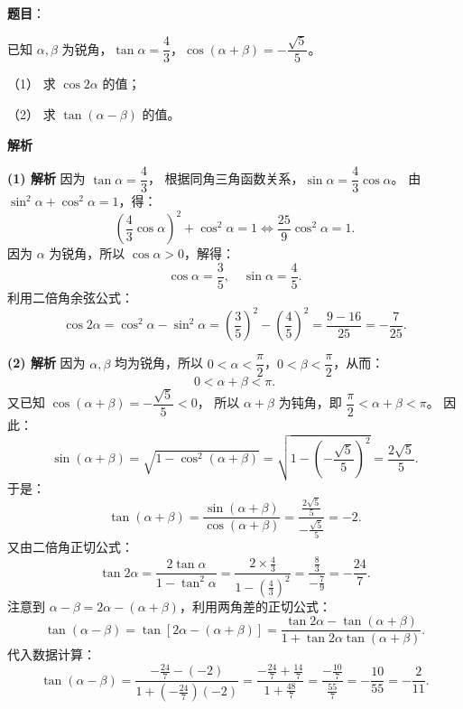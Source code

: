 \begin{answer}

\textbf{题目}：

已知 $\alpha, \beta$ 为锐角，$\tan\alpha = \dfrac{4}{3}$，$\cos(\alpha + \beta) = -\dfrac{\sqrt{5}}{5}$。

（1） 求 $\cos 2\alpha$ 的值；

（2） 求 $\tan(\alpha - \beta)$ 的值。

\textbf{解析}

\textbf{(1) 解析}
因为 $\tan\alpha = \dfrac{4}{3}$，
根据同角三角函数关系，$\sin\alpha = \dfrac{4}{3}\cos\alpha$。
由 $\sin^2\alpha + \cos^2\alpha = 1$，得：
\nopagebreak[4]
\[\left(\frac{4}{3}\cos\alpha\right)^2 + \cos^2\alpha = 1 \iff \frac{25}{9}\cos^2\alpha = 1.\]
因为 $\alpha$ 为锐角，所以 $\cos\alpha > 0$，解得：
\nopagebreak[4]
\[\cos\alpha = \frac{3}{5}, \quad \sin\alpha = \frac{4}{5}.\]
利用二倍角余弦公式：
\nopagebreak[4]
\[\cos 2\alpha = \cos^2\alpha - \sin^2\alpha = \left(\frac{3}{5}\right)^2 - \left(\frac{4}{5}\right)^2 = \frac{9 - 16}{25} = -\frac{7}{25}.\]

\textbf{(2) 解析}
因为 $\alpha, \beta$ 均为锐角，所以 $0 < \alpha < \dfrac{\pi}{2}$，$0 < \beta < \dfrac{\pi}{2}$，从而：
\nopagebreak[4]
\[0 < \alpha + \beta < \pi.\]
又已知 $\cos(\alpha + \beta) = -\dfrac{\sqrt{5}}{5} < 0$，
所以 $\alpha + \beta$ 为钝角，即 $\dfrac{\pi}{2} < \alpha + \beta < \pi$。
因此：
\nopagebreak[4]
\[\sin(\alpha + \beta) = \sqrt{1 - \cos^2(\alpha + \beta)} = \sqrt{1 - \left(-\frac{\sqrt{5}}{5}\right)^2} = \frac{2\sqrt{5}}{5}.\]
于是：
\nopagebreak[4]
\[\tan(\alpha + \beta) = \frac{\sin(\alpha + \beta)}{\cos(\alpha + \beta)} = \frac{\frac{2\sqrt{5}}{5}}{-\frac{\sqrt{5}}{5}} = -2.\]
又由二倍角正切公式：
\nopagebreak[4]
\[\tan 2\alpha = \frac{2\tan\alpha}{1 - \tan^2\alpha} = \frac{2 \times \frac{4}{3}}{1 - \left(\frac{4}{3}\right)^2} = \frac{\frac{8}{3}}{-\frac{7}{9}} = -\frac{24}{7}.\]
注意到 $\alpha - \beta = 2\alpha - (\alpha + \beta)$，利用两角差的正切公式：
\nopagebreak[4]
\[\tan(\alpha - \beta) = \tan[2\alpha - (\alpha + \beta)] = \frac{\tan 2\alpha - \tan(\alpha + \beta)}{1 + \tan 2\alpha \tan(\alpha + \beta)}.\]
代入数据计算：
\nopagebreak[4]
\[\tan(\alpha - \beta) = \frac{-\frac{24}{7} - (-2)}{1 + \left(-\frac{24}{7}\right)(-2)} = \frac{-\frac{24}{7} + \frac{14}{7}}{1 + \frac{48}{7}} = \frac{-\frac{10}{7}}{\frac{55}{7}} = -\frac{10}{55} = -\frac{2}{11}.\]



\end{answer}
